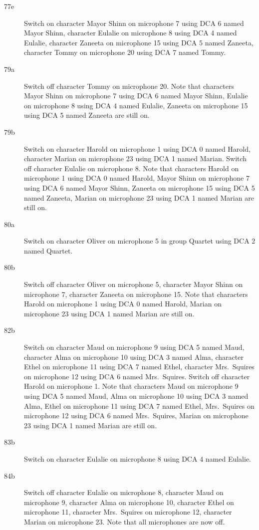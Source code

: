 \begin{description}
\item[77e]
Switch on character Mayor Shinn on microphone 7 using DCA 6 named Mayor Shinn, character Eulalie on microphone 8 using DCA 4 named Eulalie, character Zaneeta on microphone 15 using DCA 5 named Zaneeta, character Tommy on microphone 20 using DCA 7 named Tommy. 

\item[79a]
Switch off character Tommy on microphone 20. Note that characters Mayor Shinn on microphone 7 using DCA 6 named Mayor Shinn, Eulalie on microphone 8 using DCA 4 named Eulalie, Zaneeta on microphone 15 using DCA 5 named Zaneeta are still on.  

\item[79b]
Switch on character Harold on microphone 1 using DCA 0 named Harold, character Marian on microphone 23 using DCA 1 named Marian. Switch off character Eulalie on microphone 8. Note that characters Harold on microphone 1 using DCA 0 named Harold, Mayor Shinn on microphone 7 using DCA 6 named Mayor Shinn, Zaneeta on microphone 15 using DCA 5 named Zaneeta, Marian on microphone 23 using DCA 1 named Marian are still on.  

\item[80a]
Switch on character Oliver on microphone 5 in group Quartet using DCA 2 named Quartet. 

\item[80b]
Switch off character Oliver on microphone 5, character Mayor Shinn on microphone 7, character Zaneeta on microphone 15. Note that characters Harold on microphone 1 using DCA 0 named Harold, Marian on microphone 23 using DCA 1 named Marian are still on.  

\item[82b]
Switch on character Maud on microphone 9 using DCA 5 named Maud, character Alma on microphone 10 using DCA 3 named Alma, character Ethel on microphone 11 using DCA 7 named Ethel, character Mrs.~Squires on microphone 12 using DCA 6 named Mrs.~Squires. Switch off character Harold on microphone 1. Note that characters Maud on microphone 9 using DCA 5 named Maud, Alma on microphone 10 using DCA 3 named Alma, Ethel on microphone 11 using DCA 7 named Ethel, Mrs.~Squires on microphone 12 using DCA 6 named Mrs.~Squires, Marian on microphone 23 using DCA 1 named Marian are still on.  

\item[83b]
Switch on character Eulalie on microphone 8 using DCA 4 named Eulalie. 

\item[84b]
Switch off character Eulalie on microphone 8, character Maud on microphone 9, character Alma on microphone 10, character Ethel on microphone 11, character Mrs.~Squires on microphone 12, character Marian on microphone 23. Note that all microphones are now off.


\end{description}
